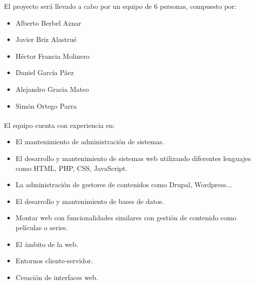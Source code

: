 El proyecto será llevado a cabo por un equipo de 6 personas, compuesto por:
\begin{itemize}
\item Alberto Berbel Aznar
\item Javier Briz Alastrué
\item Héctor Francia Molinero
\item Daniel García Páez
\item Alejandro Gracia Mateo
\item Simón Ortego Parra
\end{itemize}

\paragraph{} El equipo cuenta con experiencia en:
\begin{itemize}

\item El mantenimiento de administración de sistemas.
\item El desarrollo y mantenimiento de sistemas web utilizando diferentes lenguajes como HTML, PHP, CSS, JavaScript.
\item La administración de gestores de contenidos como Drupal, Wordpress... 
\item El desarrollo y mantenimiento de bases de datos.
\item Montar web con funcionalidades similares con gestión de contenido como películas o series.
\item El ámbito de la web.
\item Entornos cliente-servidor.
\item Creación de interfaces web.

\end{itemize}